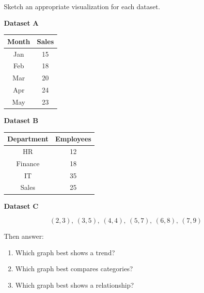 \begin{exerciseboxpaper}
Sketch an appropriate visualization for each dataset.

\textbf{Dataset A}

\begin{center}
\renewcommand{\arraystretch}{1.25}
\begin{tabular}{cc}
Month & Sales \\
\hline
Jan & 15\\
Feb & 18\\
Mar & 20\\
Apr & 24\\
May & 23
\end{tabular}
\end{center}

\vspace{\baselineskip}

\textbf{Dataset B}

\begin{center}
\renewcommand{\arraystretch}{1.25}
\begin{tabular}{cc}
Department & Employees\\
\hline
HR & 12\\
Finance & 18\\
IT & 35\\
Sales & 25
\end{tabular}
\end{center}

\vspace{\baselineskip}

\textbf{Dataset C}

\[
(2,3),\ (3,5),\ (4,4),\ (5,7),\ (6,8),\ (7,9)
\]

Then answer:

\begin{enumerate}
\item Which graph best shows a trend?
\item Which graph best compares categories?
\item Which graph best shows a relationship?
\end{enumerate}
\end{exerciseboxpaper}

